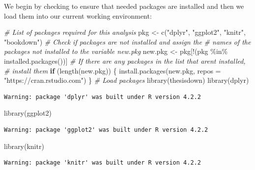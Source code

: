 \documentclass[12pt,twoside]{reedthesis}
\newenvironment{Shaded}{\begin{snugshade}}{\end{snugshade}}
\newcommand{\AttributeTok}[1]{\textcolor[rgb]{0.77,0.63,0.00}{#1}}
\newcommand{\CommentTok}[1]{\textcolor[rgb]{0.56,0.35,0.01}{\textit{#1}}}
\newcommand{\ControlFlowTok}[1]{\textcolor[rgb]{0.13,0.29,0.53}{\textbf{#1}}}
\newcommand{\FunctionTok}[1]{\textcolor[rgb]{0.00,0.00,0.00}{#1}}
\newcommand{\NormalTok}[1]{#1}
\newcommand{\OtherTok}[1]{\textcolor[rgb]{0.56,0.35,0.01}{#1}}
\newcommand{\SpecialCharTok}[1]{\textcolor[rgb]{0.00,0.00,0.00}{#1}}
\newcommand{\StringTok}[1]{\textcolor[rgb]{0.31,0.60,0.02}{#1}}
\begin{document}
We begin by checking to ensure that needed packages are installed and then we load them into our current working environment:
\begin{Shaded}
\begin{Highlighting}[]
\CommentTok{\# List of packages required for this analysis}
\NormalTok{pkg }\OtherTok{\textless{}{-}} \FunctionTok{c}\NormalTok{(}\StringTok{"dplyr"}\NormalTok{, }\StringTok{"ggplot2"}\NormalTok{, }\StringTok{"knitr"}\NormalTok{, }\StringTok{"bookdown"}\NormalTok{)}
\CommentTok{\# Check if packages are not installed and assign the}
\CommentTok{\# names of the packages not installed to the variable new.pkg}
\NormalTok{new.pkg }\OtherTok{\textless{}{-}}\NormalTok{ pkg[}\SpecialCharTok{!}\NormalTok{(pkg }\SpecialCharTok{\%in\%} \FunctionTok{installed.packages}\NormalTok{())]}
\CommentTok{\# If there are any packages in the list that aren\textquotesingle{}t installed,}
\CommentTok{\# install them}
\ControlFlowTok{if}\NormalTok{ (}\FunctionTok{length}\NormalTok{(new.pkg)) \{}
  \FunctionTok{install.packages}\NormalTok{(new.pkg, }\AttributeTok{repos =} \StringTok{"https://cran.rstudio.com"}\NormalTok{)}
\NormalTok{\}}
\CommentTok{\# Load packages}
\FunctionTok{library}\NormalTok{(thesisdown)}
\FunctionTok{library}\NormalTok{(dplyr)}
\end{Highlighting}
\end{Shaded}
\begin{verbatim}
Warning: package 'dplyr' was built under R version 4.2.2
\end{verbatim}
\begin{Shaded}
\begin{Highlighting}[]
\FunctionTok{library}\NormalTok{(ggplot2)}
\end{Highlighting}
\end{Shaded}
\begin{verbatim}
Warning: package 'ggplot2' was built under R version 4.2.2
\end{verbatim}
\begin{Shaded}
\begin{Highlighting}[]
\FunctionTok{library}\NormalTok{(knitr)}
\end{Highlighting}
\end{Shaded}
\begin{verbatim}
Warning: package 'knitr' was built under R version 4.2.2
\end{verbatim}
\clearpage
\end{document}
